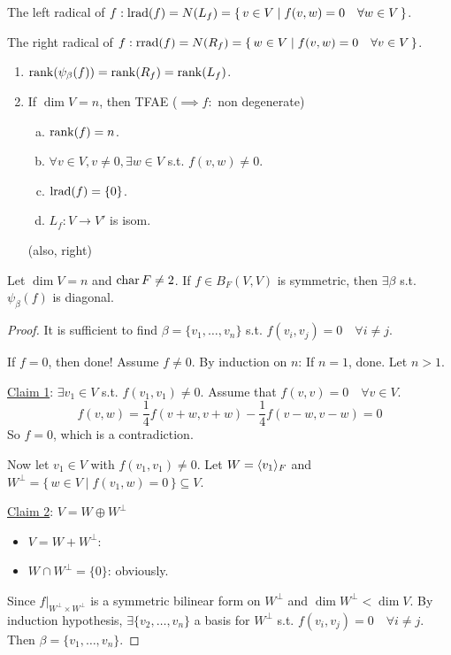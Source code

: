The left radical of $f:
\operatorname{lrad}(f) = N(L_f) = \{\, v\in V \mid f(v, w) = 0 \quad \forall w \in V \,\}$.

The right radical of $f:
\operatorname{rrad}(f) = N(R_f) = \{\, w\in V \mid f(v, w) = 0 \quad \forall v \in V \,\}$.

\begin{exercise} \mbox{}
  \begin{enumerate}
    \item $\operatorname{rank}(\psi_\beta(f)) = \operatorname{rank}(R_f) = \operatorname{rank}(L_f)$.
    \item If $\dim V = n$, then TFAE ($\implies f:$ non degenerate)
      \begin{enumerate}[(a)]
        \item $\operatorname{rank}(f) = n$.
        \item $\forall v \in V, v \ne 0, \exists w \in V$ s.t. $f(v,w) \ne 0$.
        \item $\operatorname{lrad}(f) = \{0\}$.
        \item $L_f: V \to V'$ is isom.
      \end{enumerate}
      (also, right)
  \end{enumerate}
\end{exercise}

\begin{theorem}
  Let $\dim V = n$ and $\operatorname{char} F \ne 2$.
  If $f \in B_F(V, V)$ is symmetric, then $\exists \beta$ s.t. $\psi_\beta(f)$
  is diagonal.

  \begin{proof}
    It is sufficient to find $\beta = \{v_1, \dots, v_n\}$ s.t.
    $f(v_i, v_j) = 0 \quad \forall i \ne j$.

    If $f = 0$, then done! Assume $f \ne 0$.
    By induction on $n$: If $n = 1$, done.
    Let $n > 1$.

    \underline{Claim 1}: $\exists v_1 \in V$ s.t. $f(v_1, v_1) \ne 0$.
    Assume that $f(v, v) = 0 \quad \forall v \in V$.
    \[
      f(v, w) = \frac{1}{4}f(v+w,v+w) - \frac{1}{4}f(v-w,v-w) = 0
    \]
    So $f = 0$, which is a contradiction.

    Now let $v_1 \in V$ with $f(v_1, v_1) \ne 0$. Let $W = \langle v_1\rangle_F$ and
    $W^\perp = \{\, w \in V \mid f(v_1, w) = 0 \,\} \subseteq V$.

    \underline{Claim 2}: $V = W \oplus W^\perp$
    \begin{itemize}
      \item $V = W + W^\perp$: 
      \item $W \cap W^\perp = \{0\}$: obviously.
    \end{itemize}

    Since $f \Big|_{W^\perp \times W^\perp}$ is a symmetric bilinear form
    on $W^\perp$ and $\dim W^\perp < \dim V$.
    By induction hypothesis, $\exists \{ v_2, \dots, v_n \}$ a basis for
    $W^\perp$ s.t. $f(v_i, v_j) = 0 \quad \forall i \ne j$. Then
    $\beta = \{v_1, \dots, v_n \}$.
  \end{proof}
\end{theorem}

